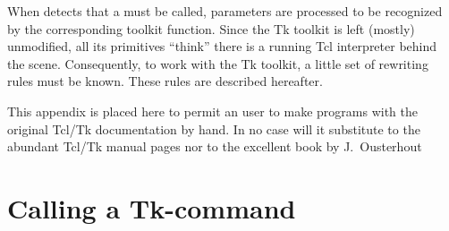 %
%
%

When {\stk} detects that a  must be called, parameters are
processed to be recognized by the corresponding toolkit function. Since the Tk
toolkit is left (mostly) unmodified, all its primitives ``think'' there is a
running Tcl interpreter behind the scene. Consequently, to work with the Tk
toolkit, a little set of rewriting rules must be known. These rules are
described hereafter.

\begin{note}
This appendix is placed here to permit an {\stk} user to make programs with
the original Tcl/Tk documentation by hand. In no case will it substitute to
the abundant Tcl/Tk manual pages nor to the excellent book by
J.~Ousterhout\cite{Ouster-book}
\end{note}

\section{Calling a Tk-command}

